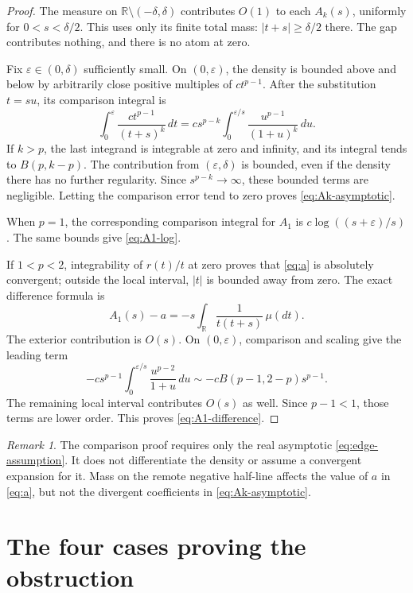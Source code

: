 \documentclass[11pt,a4paper]{article}
\theoremstyle{definition}
\theoremstyle{remark}
\newtheorem{remark}[theorem]{Remark}
\newcommand{\R}{\mathbb R}
\begin{document}
\begin{proof}
The measure on $\R\setminus(-\delta,\delta)$ contributes $O(1)$
to each $A_k(s)$, uniformly for $0<s<\delta/2$. This uses only its
finite total mass: $|t+s|\ge\delta/2$ there. The gap contributes
nothing, and there is no atom at zero.

Fix $\varepsilon\in(0,\delta)$ sufficiently small. On
$(0,\varepsilon)$, the density is bounded above and below by
arbitrarily close positive multiples of $ct^{p-1}$. After the
substitution $t=su$, its comparison integral is
\[
 \int_0^\varepsilon\frac{ct^{p-1}}{(t+s)^k}\,dt
 =cs^{p-k}\int_0^{\varepsilon/s}
            \frac{u^{p-1}}{(1+u)^k}\,du.
\]
If $k>p$, the last integrand is integrable at zero and infinity,
and its integral tends to $B(p,k-p)$. The contribution from
$(\varepsilon,\delta)$ is bounded, even if the density there has
no further regularity. Since $s^{p-k}\to\infty$, these bounded
terms are negligible. Letting the comparison error tend to zero
proves \eqref{eq:Ak-asymptotic}.

When $p=1$, the corresponding comparison integral for $A_1$ is
$c\log((s+\varepsilon)/s)$. The same bounds give
\eqref{eq:A1-log}.

If $1<p<2$, integrability of $r(t)/t$ at zero proves that
\eqref{eq:a} is absolutely convergent; outside the local interval,
$|t|$ is bounded away from zero. The exact difference formula is
\begin{equation}\label{eq:difference-exact}
 A_1(s)-a=-s\int_\R\frac{1}{t(t+s)}\,\mu(dt).
\end{equation}
The exterior contribution is $O(s)$. On $(0,\varepsilon)$,
comparison and scaling give the leading term
\[
 -cs^{p-1}\int_0^{\varepsilon/s}
              \frac{u^{p-2}}{1+u}\,du
 \sim-cB(p-1,2-p)s^{p-1}.
\]
The remaining local interval contributes $O(s)$ as well. Since
$p-1<1$, those terms are lower order. This proves
\eqref{eq:A1-difference}.
\end{proof}

\begin{remark}
The comparison proof requires only the real asymptotic
\eqref{eq:edge-assumption}. It does not differentiate the density
or assume a convergent expansion for it. Mass on the remote
negative half-line affects the value of $a$ in \eqref{eq:a}, but
not the divergent coefficients in \eqref{eq:Ak-asymptotic}.
\end{remark}

\section{The four cases proving the obstruction}\label{sec:fourcases}
\end{document}

